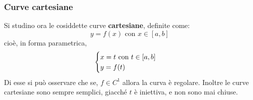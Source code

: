 \subsubsection{Curve cartesiane}
    Si studino ora le cosiddette curve \textbf{cartesiane}, definite come: 
    \begin{equation}
        y=f(x) \text{ con } x \in [a,b] 
    \end{equation}
    cioè, in forma parametrica,
    \begin{equation}
        \begin{cases}
            x=t \text{ con } t\in[a,b]\\ y=f(t)
        \end{cases}\\
    \end{equation}
    Di esse si può osservare che se, $f \in C^1$ allora la curva è regolare. Inoltre le curve cartesiane sono sempre semplici, giacché $t$ è iniettiva, e non sono mai chiuse.


